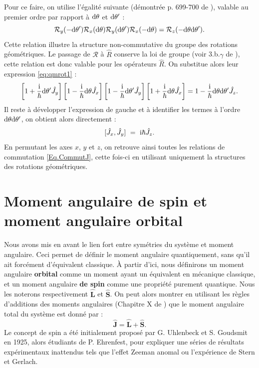 Pour ce faire, on utilise l'égalité suivante (démontrée p. 699-700 de ), valable au premier ordre par rapport à $\mathrm{d}\theta$ et $\mathrm{d}\theta'$ :
\[\mathcal{R}_y(-\mathrm{d}\theta')\mathcal{R}_x(\mathrm{d}\theta)\mathcal{R}_y(\mathrm{d}\theta')\mathcal{R}_x(-\mathrm{d}\theta)=\mathcal{R}_z(-\mathrm{d}\theta\mathrm{d}\theta').\]
Cette relation illustre la structure non-commutative du groupe des rotations géométriques. Le passage de $\mathcal{R}$ à $\hat{R}$ conserve la loi de groupe (voir 3.b.$\gamma$ de ), cette relation est donc valable pour les opérateurs $\hat{R}$. On substitue alors leur expression \ref{eq:qmrot1} :
\[\left[1+\frac{\mathrm{i}}{\hbar}\mathrm{d}\theta'\hat{J_y}\right]
\left[1-\frac{\mathrm{i}}{\hbar}\mathrm{d}\theta\hat{J_x}\right]
\left[1-\frac{\mathrm{i}}{\hbar}\mathrm{d}\theta'\hat{J_y}\right]
\left[1+\frac{\mathrm{i}}{\hbar}\mathrm{d}\theta\hat{J_x}\right] = 
1-\frac{\mathrm{i}}{\hbar}\mathrm{d}\theta\mathrm{d}\theta'\hat{J_z}. \]
Il reste à développer l'expression de gauche et à identifier les termes à l'ordre $\mathrm{d}\theta\mathrm{d}\theta'$, on obtient alors directement :
\[[\hat{J}_x,\hat{J}_y]~=~\mathrm{i}\hbar \hat{J}_z.\]
En permutant les axes $x$, $y$ et $z$, on retrouve ainsi toutes les relations de commutation \ref{Eq.CommutJ}, cette fois-ci en utilisant uniquement la structures des rotations géométriques. 

\section{Moment angulaire de spin et moment angulaire orbital}
Nous avons mis en avant le lien fort entre symétries du système et moment angulaire. Ceci permet de définir le moment angulaire quantiquement, sans qu'il ait forcément d'équivalent classique. \`A partir d'ici, nous définirons un moment angulaire \textbf{orbital} comme un moment ayant un équivalent en mécanique classique, et un moment angulaire \textbf{de spin} comme une propriété purement quantique. Nous les noterons respectivement $\bm{\hat{L}}$ et $\bm{\hat{S}}$. On peut alors montrer en utilisant les règles d'additions des moments angulaires (Chapitre X de ) que le moment angulaire total du système est donné par :
\begin{equation}
\bm{\hat{J}}=\bm{\hat{L}}+\bm{\hat{S}}.
\label{Eq.JegalLplusS}
\end{equation}
Le concept de spin a été initialement proposé par G. Uhlenbeck et S. Goudsmit en 1925, alors étudiants de P. Ehrenfest, pour expliquer une séries de résultats expérimentaux inattendus tels que l'effet Zeeman anomal ou l'expérience de Stern et Gerlach. 

